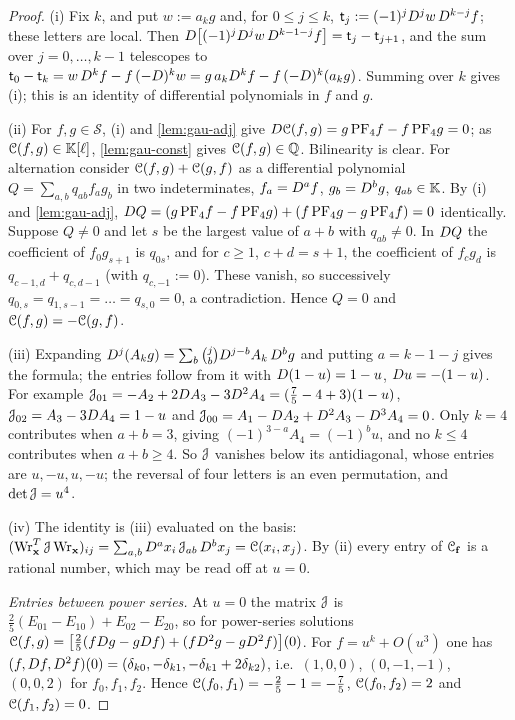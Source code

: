 \begin{proof}
(i) Fix $k$, and put $w:=a_kg$ and, for $0\leq j\leq k$, $\mathsf t_j:=(-1)^jD^jw\,D^{k-j}f$; these letters are local. Then $D\bigl[(-1)^jD^jw\,D^{k-1-j}f\bigr]=\mathsf t_j-\mathsf t_{j+1}$, and the sum over $j=0,\dots,k-1$ telescopes to $\mathsf t_0-\mathsf t_k=w\,D^kf-f\,(-D)^kw=g\,a_kD^kf-f\,(-D)^k(a_kg)$. Summing over $k$ gives (i); this is an identity of differential polynomials in $f$ and $g$.

(ii) For $f,g\in\mathcal S$, (i) and \cref{lem:gau-adj} give $D\mathcal{C}(f,g)=g\,\mathrm{PF}_{4} f-f\,\mathrm{PF}_{4} g=0$; as $\mathcal{C}(f,g)\in\mathbb{K}[\ell]$, \cref{lem:gau-const} gives $\mathcal{C}(f,g)\in\mathbb{Q}$. Bilinearity is clear. For alternation consider $\mathcal{C}(f,g)+\mathcal{C}(g,f)$ as a differential polynomial $Q=\sum_{a,b}q_{ab}f_ag_b$ in two indeterminates, $f_a=D^af$, $g_b=D^bg$, $q_{ab}\in\mathbb{K}$. By (i) and \cref{lem:gau-adj}, $D Q=(g\,\mathrm{PF}_{4} f-f\,\mathrm{PF}_{4} g)+(f\,\mathrm{PF}_{4} g-g\,\mathrm{PF}_{4} f)=0$ identically. Suppose $Q\neq0$ and let $s$ be the largest value of $a+b$ with $q_{ab}\neq0$. In $D Q$ the coefficient of $f_0g_{s+1}$ is $q_{0s}$, and for $c\geq1$, $c+d=s+1$, the coefficient of $f_cg_d$ is $q_{c-1,d}+q_{c,d-1}$ (with $q_{c,-1}:=0$). These vanish, so successively $q_{0,s}=q_{1,s-1}=\dots=q_{s,0}=0$, a contradiction. Hence $Q=0$ and $\mathcal{C}(f,g)=-\mathcal{C}(g,f)$.

(iii) Expanding $D^j(A_kg)=\sum_b\binom jbD^{j-b}A_k\,D^bg$ and putting $a=k-1-j$ gives the formula; the entries follow from it with $D(1-u)=1-u$, $D u=-(1-u)$. For example $\mathcal{J}_{01}=-A_2+2D A_3-3D^2A_4=(\frac75-4+3)(1-u)$, $\mathcal{J}_{02}=A_3-3D A_4=1-u$ and $\mathcal{J}_{00}=A_1-D A_2+D^2A_3-D^3A_4=0$. Only $k=4$ contributes when $a+b=3$, giving $(-1)^{3-a}A_4=(-1)^bu$, and no $k\leq4$ contributes when $a+b\geq4$. So $\mathcal{J}$ vanishes below its antidiagonal, whose entries are $u,-u,u,-u$; the reversal of four letters is an even permutation, and $\det\mathcal{J}=u^4$.

(iv) The identity is (iii) evaluated on the basis: $(\operatorname{Wr}_{\mathbf x}^T\mathcal{J}\operatorname{Wr}_{\mathbf x})_{ij}=\sum_{a,b}D^ax_i\,\mathcal{J}_{ab}\,D^bx_j=\mathcal{C}(x_i,x_j)$. By (ii) every entry of $\mathcal{C}_{\mathbf f}$ is a rational number, which may be read off at $u=0$.

\emph{Entries between power series.} At $u=0$ the matrix $\mathcal{J}$ is $\frac25(E_{01}-E_{10})+E_{02}-E_{20}$, so for power-series solutions $\mathcal{C}(f,g)=\bigl[\frac25(fD g-gD f)+(fD^2g-gD^2f)\bigr](0)$. For $f=u^k+O(u^3)$ one has $(f,D f,D^2f)(0)=(\delta_{k0},-\delta_{k1},-\delta_{k1}+2\delta_{k2})$, i.e.\ $(1,0,0)$, $(0,-1,-1)$, $(0,0,2)$ for $f_0,f_1,f_2$. Hence $\mathcal{C}(f_0,f_1)=-\frac25-1=-\frac75$, $\mathcal{C}(f_0,f_2)=2$ and $\mathcal{C}(f_1,f_2)=0$.


\end{proof}
